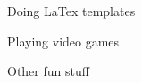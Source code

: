 \documentclass[11pt]{strongalecv}
\begin{document}
\begin{MainPart}
    \vspace*{0.5cm}
    \begin{DoubleColumns}
        \begin{ItemList}{\ColorHighlight}
            \item [] Doing LaTex templates
            \item [] Playing video games
        \end{ItemList}
        \nextcolumn
        \begin{ItemList}{\ColorHighlight}
            \item [] Other fun stuff
        \end{ItemList}
    \end{DoubleColumns}

    \end{MainPart}

    
\end{document}

